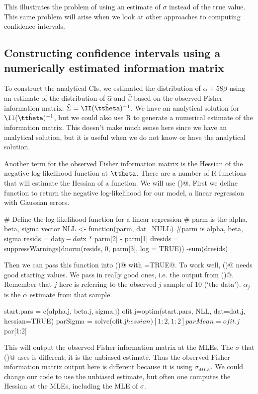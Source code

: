 This illustrates the problem of using an estimate of $\sigma$ instead of the true value.  This same problem will arise when we look at other approaches to computing confidence intervals.


\subsection{Constructing confidence intervals using a numerically estimated information matrix}

To construct the analytical CIs, we estimated the distribution of $\alpha + 58 \beta$ using an estimate of the distribution of $\hat{\alpha}$ and $\hat{\beta}$ based on the observed Fisher information matrix: $\hat{\Sigma}= \II(\hat{\ttheta})^{-1}$.  We have an analytical solution for $\II(\hat{\ttheta})^{-1}$, but we could also use R to generate a numerical estimate of the information matrix. This doesn't make much sense here since we have an analytical solution, but it is useful when we do not know or have the analytical solution. 

Another term for the observed Fisher information matrix is the Hessian of the negative log-likelihood function at $\hat{\ttheta}$. There are a number of R functions that will estimate the Hessian of a function.  We will use \verb@optim()@.  First we define function to return the negative log-likelihood for our model, a linear regression with Gaussian errors.  

\begin{Schunk}
\begin{Sinput}
 # Define the log likelihood function for a linear regression
 # parm is the alpha, beta, sigma vector
 NLL <- function(parm,  dat=NULL){
   #parm is alpha, beta, sigma
   resids = dat$y - dat$x * parm[2] - parm[1]
   dresids = suppressWarnings(dnorm(resids, 0, parm[3], log = TRUE))
   -sum(dresids)
 }
\end{Sinput}
\end{Schunk}

Then we can pass this function into \verb@optim()@ with \verb@hessian=TRUE@.  To work well, \verb@optim()@ needs good starting values.  We pass in really good ones, i.e. the output from \verb@lm()@.  Remember that $j$ here is referring to the observed $j$ sample of 10 (`the data').  $\alpha_j$ is the $\alpha$ estimate from that sample.
\begin{Schunk}
\begin{Sinput}
 start.pars = c(alpha.j, beta.j, sigma.j)
 ofit.j=optim(start.pars, NLL, dat=dat.j, hessian=TRUE)
 parSigma = solve(ofit.j$hessian)[1:2,1:2]
 parMean = ofit.j$par[1:2]
\end{Sinput}
\end{Schunk}
This will output the observed Fisher information matrix at the MLEs.  The $\sigma$ that \verb@lm()@ uses is different; it is the unbiased estimate.  Thus the observed Fisher information matrix output here is different because it is using $\sigma_{MLE}$.  We could change our code to use the unbiased estimate, but often one computes the Hessian at the MLEs, including the MLE of $\sigma$. 

